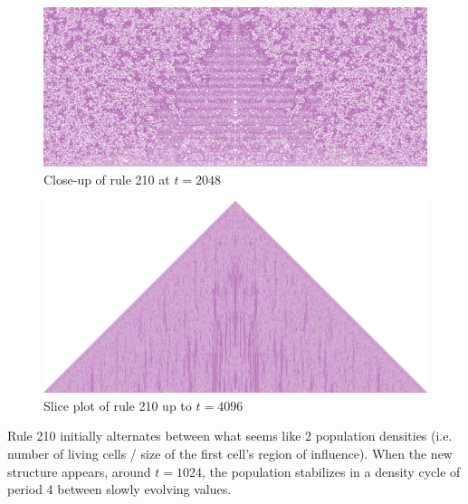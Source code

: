 \documentclass{article}
\begin{document}
\begin{figure}[H]
    \centering
    \includegraphics[width=\textwidth]{graphics/behavior/rule-210/rule-210-time-2048-close-up.pdf}
    \vspace{-18pt}
    \caption{Close-up of rule 210 at $t=2048$}
    \label{fig:rule-210-close-up-2048}
\end{figure}
\vspace{-10pt}
\begin{figure}[H]
    \centering
    \includegraphics[width=.9\textwidth]{graphics/behavior/rule-210/rule-210-slice-4096.png}
    \vspace{-6pt}
    \caption{Slice plot of rule 210 up to $t=4096$}
    \label{fig:rule-210-slice-2816}
\end{figure}

\noindent Rule 210 initially alternates between what seems like 2 population densities (i.e. number of living cells / size of the first cell's region of influence). When the new structure appears, around $t=1024$, the population stabilizes in a density cycle of period 4 between slowly evolving values.
\end{document}
